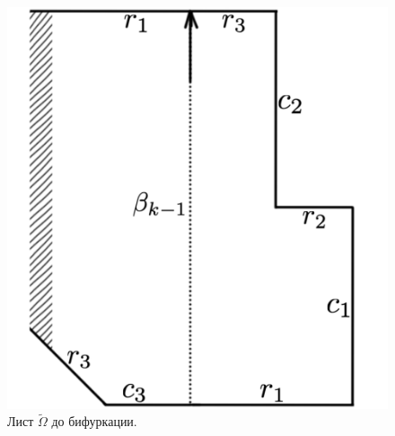 \begin{figure}[!htb]
\centering
\includegraphics[scale=0.11]{images/section3_circular/atoms/III/page_segment_1.pdf}
    \caption{Лист $\widetilde{\Omega}$ до бифуркации.}
    \label{fig:pt10:_III_page_segment_1}
\endminipage\hfill
{}
\centering

\end{figure}
